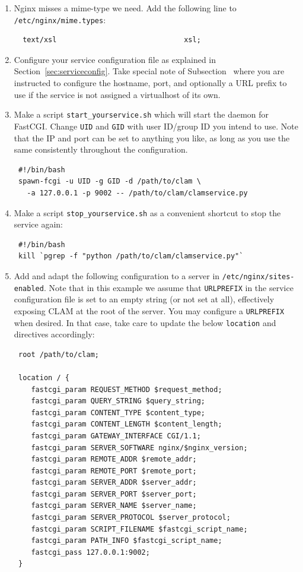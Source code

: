 \documentclass[a4paper,12pt]{report}
\begin{document}
\begin{enumerate}
\item Nginx misses a mime-type we need. Add the following line to \texttt{/etc/nginx/mime.types}:
\begin{verbatim}
  text/xsl                              xsl;
\end{verbatim}

\item Configure your service configuration file as explained in Section~\ref{sec:serviceconfig}. Take special note of Subsection~\label{sec:sadmin} where you are instructed to configure the hostname, port, and optionally a URL prefix to use if the service is not assigned a virtualhost of its own.

\item Make a script \texttt{start\_yourservice.sh} which will start the daemon for FastCGI. Change \texttt{UID} and \texttt{GID} with user ID/group ID you intend to use. Note that the IP and port can be set to anything you like, as long as you use the same consistently throughout the configuration.
\begin{verbatim}
 #!/bin/bash
 spawn-fcgi -u UID -g GID -d /path/to/clam \
   -a 127.0.0.1 -p 9002 -- /path/to/clam/clamservice.py
\end{verbatim}

\item Make a script \texttt{stop\_yourservice.sh} as a convenient shortcut to stop the service again:
\begin{verbatim}
 #!/bin/bash
 kill `pgrep -f "python /path/to/clam/clamservice.py"`
\end{verbatim}

\item Add and adapt the following configuration to a server in \texttt{/etc/nginx/sites-enabled}. Note that in this example we assume that \texttt{URLPREFIX} in the service configuration file is set to an empty string (or not set at all), effectively exposing CLAM at the root of the server. You may configure a \texttt{URLPREFIX} when desired. In that case, take care to update the below \texttt{location} and directives accordingly:
\begin{verbatim}
 root /path/to/clam;

 location / {
    fastcgi_param REQUEST_METHOD $request_method;
    fastcgi_param QUERY_STRING $query_string;
    fastcgi_param CONTENT_TYPE $content_type;
    fastcgi_param CONTENT_LENGTH $content_length;
    fastcgi_param GATEWAY_INTERFACE CGI/1.1;
    fastcgi_param SERVER_SOFTWARE nginx/$nginx_version;
    fastcgi_param REMOTE_ADDR $remote_addr;
    fastcgi_param REMOTE_PORT $remote_port;
    fastcgi_param SERVER_ADDR $server_addr;
    fastcgi_param SERVER_PORT $server_port;
    fastcgi_param SERVER_NAME $server_name;
    fastcgi_param SERVER_PROTOCOL $server_protocol;
    fastcgi_param SCRIPT_FILENAME $fastcgi_script_name;
    fastcgi_param PATH_INFO $fastcgi_script_name;
    fastcgi_pass 127.0.0.1:9002;
 }


\end{verbatim}
\end{enumerate}
\end{document}
